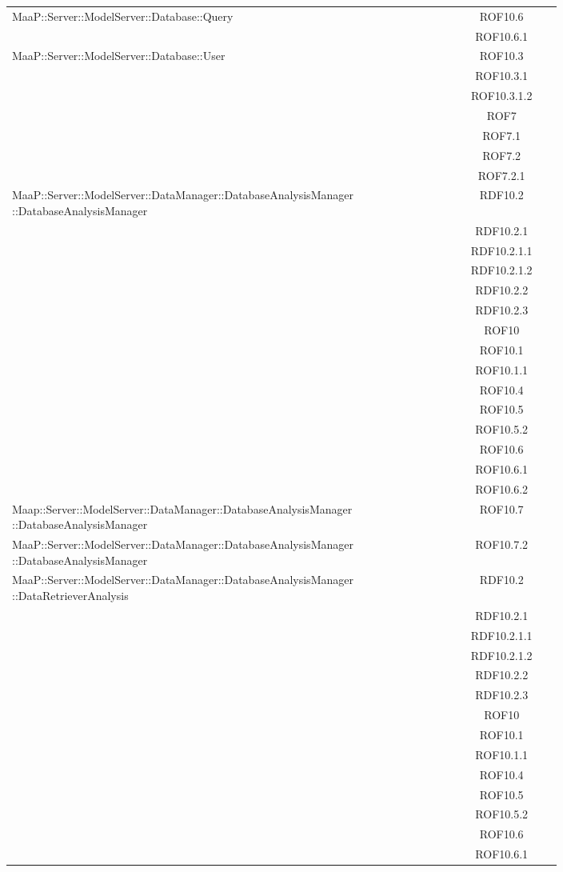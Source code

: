 \begin{center}
\begin{longtable}{|p{0.8\linewidth}|c|}
\midrule
MaaP::Server::ModelServer::Database::Query
& ROF10.6\\
& ROF10.6.1\\

\midrule
MaaP::Server::ModelServer::Database::User
& ROF10.3\\
& ROF10.3.1\\
& ROF10.3.1.2\\
& ROF7\\
& ROF7.1\\
& ROF7.2\\
& ROF7.2.1\\

\midrule
MaaP::Server::ModelServer::DataManager::DatabaseAnalysisManager ::DatabaseAnalysisManager
& RDF10.2\\
& RDF10.2.1\\
& RDF10.2.1.1\\
& RDF10.2.1.2\\
& RDF10.2.2\\
& RDF10.2.3\\
& ROF10\\
& ROF10.1\\
& ROF10.1.1\\
& ROF10.4\\
& ROF10.5\\
& ROF10.5.2\\
& ROF10.6\\
& ROF10.6.1\\
& ROF10.6.2\\

\midrule
Maap::Server::ModelServer::DataManager::DatabaseAnalysisManager ::DatabaseAnalysisManager
& ROF10.7\\

\midrule
MaaP::Server::ModelServer::DataManager::DatabaseAnalysisManager ::DatabaseAnalysisManager
& ROF10.7.2\\

\midrule
MaaP::Server::ModelServer::DataManager::DatabaseAnalysisManager ::DataRetrieverAnalysis
& RDF10.2\\
& RDF10.2.1\\
& RDF10.2.1.1\\
& RDF10.2.1.2\\
& RDF10.2.2\\
& RDF10.2.3\\
& ROF10\\
& ROF10.1\\
& ROF10.1.1\\
& ROF10.4\\
& ROF10.5\\
& ROF10.5.2\\
& ROF10.6\\
& ROF10.6.1\\


\end{longtable}
\end{center}
